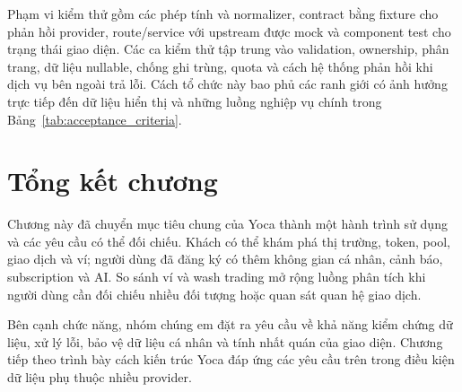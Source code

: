 Phạm vi kiểm thử gồm các phép tính và normalizer, contract bằng fixture cho phản hồi provider, route/service với upstream được mock và component test cho trạng thái giao diện. Các ca kiểm thử tập trung vào validation, ownership, phân trang, dữ liệu nullable, chống ghi trùng, quota và cách hệ thống phản hồi khi dịch vụ bên ngoài trả lỗi. Cách tổ chức này bao phủ các ranh giới có ảnh hưởng trực tiếp đến dữ liệu hiển thị và những luồng nghiệp vụ chính trong Bảng~\ref{tab:acceptance_criteria}.

\section{Tổng kết chương}

Chương này đã chuyển mục tiêu chung của Yoca thành một hành trình sử dụng và các yêu cầu có thể đối chiếu. Khách có thể khám phá thị trường, token, pool, giao dịch và ví; người dùng đã đăng ký có thêm không gian cá nhân, cảnh báo, subscription và AI. So sánh ví và wash trading mở rộng luồng phân tích khi người dùng cần đối chiếu nhiều đối tượng hoặc quan sát quan hệ giao dịch.

Bên cạnh chức năng, nhóm chúng em đặt ra yêu cầu về khả năng kiểm chứng dữ liệu, xử lý lỗi, bảo vệ dữ liệu cá nhân và tính nhất quán của giao diện. Chương tiếp theo trình bày cách kiến trúc Yoca đáp ứng các yêu cầu trên trong điều kiện dữ liệu phụ thuộc nhiều provider.
